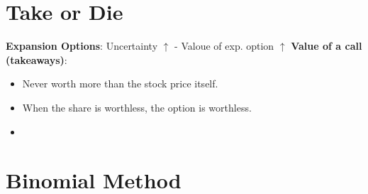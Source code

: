 \documentclass{cheatsheet}
\begin{document}
\section{Take or Die}
\textbf{Expansion Options}: Uncertainty $\uparrow$ - Valoue of exp. option $\uparrow$
\textbf{Value of a call (takeaways)}: 
\begin{itemize}
  \item Never worth more than the stock price itself.
  \item When the share is worthless, the option is worthless.
  \item 
\end{itemize}

\section*{Binomial Method}
\end{document}
